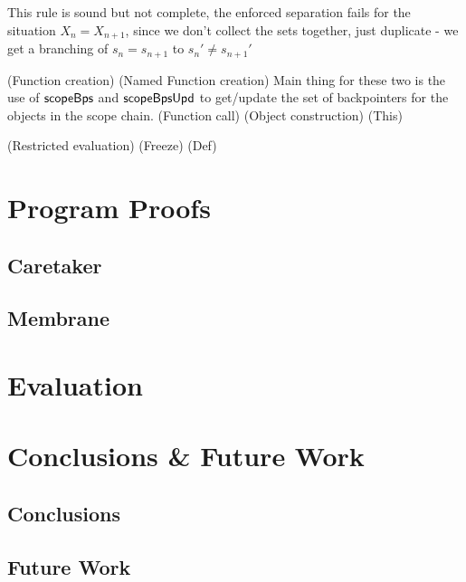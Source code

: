 \documentclass[a4paper,notitlepage]{report}
\begin{document}
This rule is sound but not complete, the enforced separation fails for the
situation $X_n = X_{n+1}$, since we don't collect the sets together, just
duplicate - we get a branching of $s_n=s_{n+1}$ to $s_n' \neq s_{n+1}'$

(Function creation)
(Named Function creation)
Main thing for these two is the use of $\mathsf{scopeBps}$ and $\mathsf{scopeBpsUpd}$ to
get/update the set of backpointers for the objects in the scope chain.
(Function call)
(Object construction)
(This)

(Restricted evaluation)
(Freeze)
(Def)

\chapter{Program Proofs}
\section{Caretaker}
\section{Membrane}

\chapter{Evaluation}
\chapter{Conclusions \& Future Work}
\section{Conclusions}
\section{Future Work}




\appendix
\end{document}
